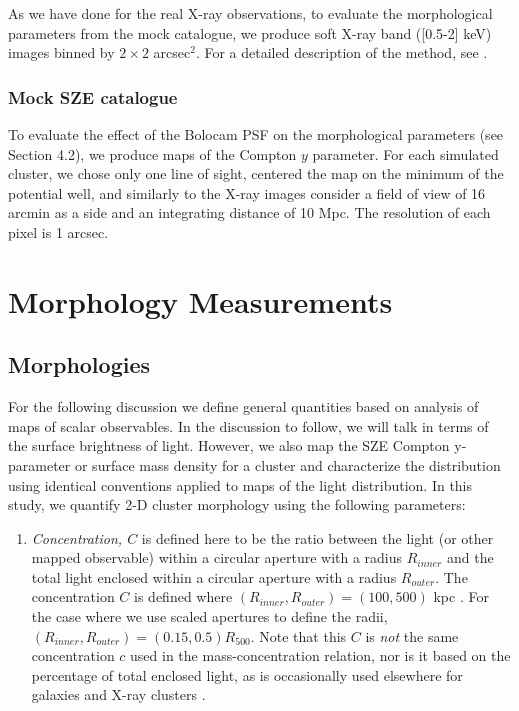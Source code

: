 \documentclass[iop,twocolumn]{emulateapj}
\begin{document}
{As we have done for the real X-ray observations, to evaluate the morphological
parameters from the mock catalogue, we produce soft X-ray band ([0.5-2]
keV) images binned by $2\times 2$ arcsec$^2$. 
For a detailed description of the method, see \citealt{rasia.etal.2013}.

\subsubsection{Mock SZE catalogue}
To evaluate the effect of the Bolocam PSF on the morphological parameters 
(see Section 4.2), we produce maps of the Compton $y$ parameter. 
For each simulated cluster, we chose only one line of sight, centered the map
on the minimum of the potential well, and similarly to the X-ray images consider 
a field of view of 16 arcmin as a side and an integrating distance of 10 Mpc. 
The resolution of each pixel is 1 arcsec.

\section{Morphology Measurements}

\subsection{Morphologies \label{section:defs}}

For the following discussion we define general quantities based on analysis of maps of
scalar observables. 
In the discussion to follow, we will talk in terms of the
surface brightness of light. However, we also map the SZE Compton y-parameter or
surface mass density for a cluster and characterize the distribution using
identical conventions applied to maps of the light distribution.
In this study, we quantify 2-D cluster morphology using the following parameters:

\begin{enumerate}

\item {\it Concentration, $C$} is defined here to be the ratio between the light (or other mapped 
observable) within a circular aperture with a radius $R_{inner}$ and the
total light enclosed within a circular aperture with a radius $R_{outer}$. The concentration $C$ is defined where $(R_{inner},R_{outer}) = 
(100, 500)$ kpc \citep[See also ][]{2010ApJ...721L..82C}. For the case where we use scaled apertures to define the radii, $(R_{inner},R_{outer}) = 
(0.15, 0.5) R_{500}$. Note that this $C$ is {\em not} the same concentration $c$ used in the mass-concentration relation, nor is
it based on the percentage of total enclosed light, as is occasionally used elsewhere for galaxies and X-ray clusters \citep[e.g.,][]{1994ApJ...432...75A}. 


\end{enumerate}}
\end{document}

